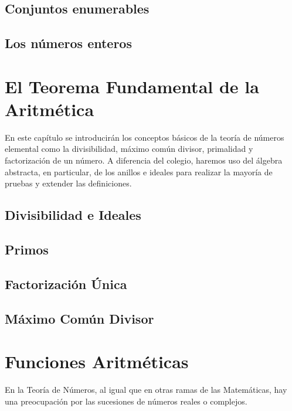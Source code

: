 \documentclass{article}
\theoremstyle{definition}
\theoremstyle{remark}
\begin{document}
\subsection{Conjuntos enumerables}


\subsection{Los n\'umeros enteros}


\newpage
\section{El Teorema Fundamental de la Aritm\'etica}
En este cap\'itulo se introducir\'an los conceptos b\'asicos de la teor\'ia de n\'umeros elemental como la divisibilidad, m\'aximo com\'un divisor, primalidad y factorizaci\'on de un n\'umero. A diferencia del colegio, haremos uso del \'algebra abstracta, en particular, de los anillos e ideales para realizar la mayor\'ia de pruebas y extender las definiciones.

\subsection{Divisibilidad e Ideales}


\subsection{Primos}


\subsection{Factorizaci\'on \'Unica}


\subsection{M\'aximo Com\'un Divisor}


\newpage
\section{Funciones Aritm\'eticas}
En la Teor\'ia de N\'umeros, al igual que en otras ramas de las Matem\'aticas, hay una preocupaci\'on por las sucesiones de n\'umeros reales o complejos.
\end{document}
